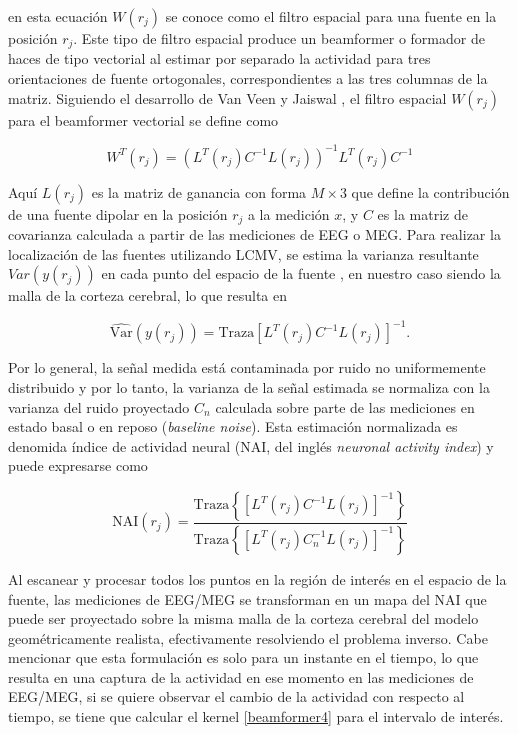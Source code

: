 en esta ecuación $W(r_j)$ se conoce como el filtro espacial para una fuente en la posición $r_j$. Este tipo de filtro espacial produce un beamformer o formador de haces de tipo vectorial al estimar por separado la actividad para tres orientaciones de fuente ortogonales, correspondientes a las tres columnas de la matriz. Siguiendo el desarrollo de Van Veen y Jaiswal \cite{VanVeen1997,Jaiswal2020}, el filtro espacial $W(r_j)$ para el beamformer vectorial se define como

\begin{equation}
	\label{beamformer2}
W^{T}(r_j) = (L^{T}(r_j)C^{-1}L(r_j))^{-1}L^{T}(r_j)C^{-1}
\end{equation}

Aquí $L(r_j)$ es la matriz de ganancia con forma $M \times 3$ que define la contribución de una fuente dipolar en la posición $r_j$ a la medición $x$, y $C$ es la matriz de covarianza calculada a partir de las mediciones de EEG o MEG. Para realizar la localización de las fuentes utilizando LCMV, se estima la varianza resultante $Var(y(r_j))$ en cada punto del espacio de la fuente \cite{VanVeen1997,Jaiswal2020}, en nuestro caso siendo la malla de la corteza cerebral, lo que resulta en

\begin{equation}
	\label{beamformer3}
\widehat{\text{Var}}(y(r_j)) = \text{Traza}[L^{T}(r_j)C^{-1}L(r_j)]^{-1}.
\end{equation}

Por lo general, la señal medida está contaminada por ruido no uniformemente distribuido y por lo tanto, la varianza de la señal estimada se normaliza con la varianza del ruido proyectado $C_n$ calculada sobre parte de las mediciones en estado basal o en reposo (\emph{baseline noise}). Esta estimación normalizada es denomida índice de actividad neural (NAI, del inglés \emph{neuronal activity index}) \cite{VanVeen1997} y puede expresarse como

\begin{equation}
	\label{beamformer4}
\text{NAI}(r_j) = \frac{\text{Traza}\left\{[L^{T}(r_j)C^{-1}L(r_j)]^{-1}\right\}}{\text{Traza}\left\{[L^{T}(r_j)C_n^{-1}L(r_j)]^{-1}\right\}}
\end{equation}

Al escanear y procesar todos los puntos en la región de interés en el espacio de la fuente, las mediciones de EEG/MEG se transforman en un mapa del NAI que puede ser proyectado sobre la misma malla de la corteza cerebral del modelo geométricamente realista, efectivamente resolviendo el problema inverso. Cabe mencionar que esta formulación es solo para un instante en el tiempo, lo que resulta en una captura de la actividad en ese momento en las mediciones de EEG/MEG, si se quiere observar el cambio de la actividad con respecto al tiempo, se tiene que calcular el kernel \cref{beamformer4}  para el intervalo de interés.

